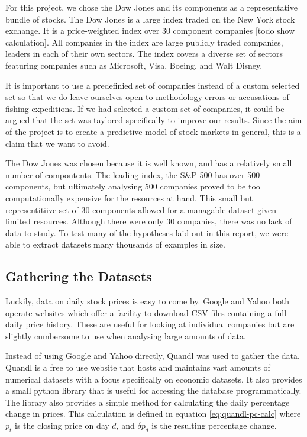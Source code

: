 \documentclass{report}
\begin{document}
For this project, we chose the Dow Jones and its components as a representative bundle of stocks. The Dow Jones is a large index traded on the New York stock exchange. It is a price-weighted index over 30 component companies [todo show calculation]. All companies in the index are large publicly traded companies, leaders in each of their own sectors. The index covers a diverse set of sectors featuring companies such as Microsoft, Visa, Boeing, and Walt Disney.

It is important to use a predefinied set of companies instead of a custom selected set so that we do leave ourselves open to methodology errors or accusations of fishing expeditions. If we had selected a custom set of companies, it could be argued that the set was taylored specifically to improve our results. Since the aim of the project is to create a predictive model of stock markets in general, this is a claim that we want to avoid. 

The Dow Jones was chosen because it is well known, and has a relatively small number of compontents. The leading index, the S\&P 500 has over 500 components, but ultimately analysing 500 companies proved to be too computationally expensive for the resources at hand. This small but representitiive set of 30 components allowed for a managable dataset given limited resources. Although there were only 30 companies, there was no lack of data to study. To test many of the hypotheses laid out in this report, we were able to extract datasets many thousands of examples in size.

\subsection{Gathering the Datasets}

Luckily, data on daily stock prices is easy to come by. Google and Yahoo both operate websites which offer a facility to download CSV files containing a full daily price history. These are useful for looking at individual companies but are slightly cumbersome to use when analysing large amounts of data. 

Instead of using Google and Yahoo directly, Quandl\cite{website:quandl} was used to gather the data. Quandl is a free to use website that hosts and maintains vast amounts of numerical datasets with a focus specifically on economic datasets. It also provides a small python library that is useful for accessing the database programmatically. The library also provides a simple method for calculating the daily percentage change in prices. This calculation is defined in equation \ref{eq:quandl-pc-calc} where $p_{t}$ is the closing price on day $d$, and $\delta p_{d}$ is the resulting percentage change.  
\end{document}
